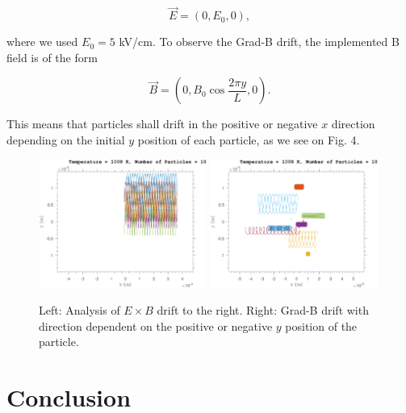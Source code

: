 \begin{equation}
\vec E = (0,E_0,0),
\end{equation}

\noindent where we used $E_0 = 5$ kV/cm. To observe the Grad-B drift, the implemented B field is of the form

\begin{equation}
\vec B = (0,B_0 \cos \frac{2 \pi y}{L},0).
\end{equation}

This means that particles shall drift in the positive or negative $x$ direction depending on the initial $y$ position of each particle, as we see on Fig. 4.

\begin{figure}[h!]
  \centering
    \includegraphics[width=0.49\textwidth]{../Results/Lorentz_xy_RK4_unifB_E5_10particles.pdf}
    \includegraphics[width=0.49\textwidth]{../Results/Lorentz_xy_RK4_cosB_E0_10particles.pdf}
    \label{drift}
      \caption{Left: Analysis of $E \times B$ drift to the right. Right: Grad-B drift with direction dependent on the positive or negative $y$ position of the particle.}
\end{figure}


\section{Conclusion}

